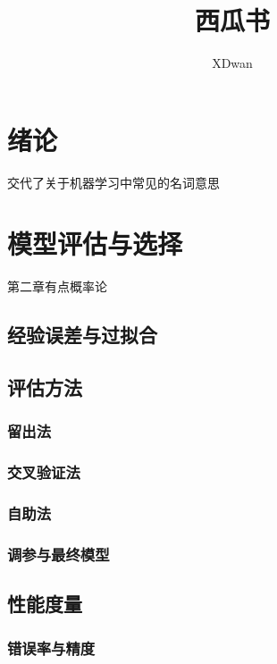 \documentclass{article}
\title{西瓜书}
\author{XDwan}
\begin{document}
    

\maketitle

\renewcommand{\contentsname}{目录}%
\tableofcontents
\newpage

\section{绪论}

交代了关于机器学习中常见的名词意思


\newpage

\section{模型评估与选择}

第二章有点概率论

\subsection{经验误差与过拟合}

\subsection{评估方法}

\subsubsection{留出法}

\subsubsection{交叉验证法}

\subsubsection{自助法}

\subsubsection{调参与最终模型}

\subsection{性能度量}

\subsubsection{错误率与精度}
\end{document}
